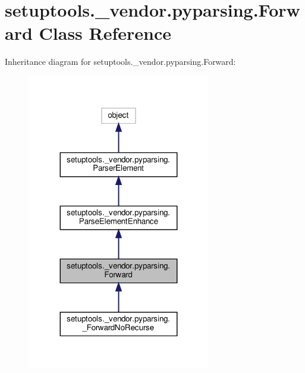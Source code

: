 \hypertarget{classsetuptools_1_1__vendor_1_1pyparsing_1_1Forward}{}\section{setuptools.\+\_\+vendor.\+pyparsing.\+Forward Class Reference}
\label{classsetuptools_1_1__vendor_1_1pyparsing_1_1Forward}


Inheritance diagram for setuptools.\+\_\+vendor.\+pyparsing.\+Forward\+:
\nopagebreak
\begin{figure}[H]
\begin{center}
\leavevmode
\includegraphics[width=227pt]{classsetuptools_1_1__vendor_1_1pyparsing_1_1Forward__inherit__graph}
\end{center}
\end{figure}


